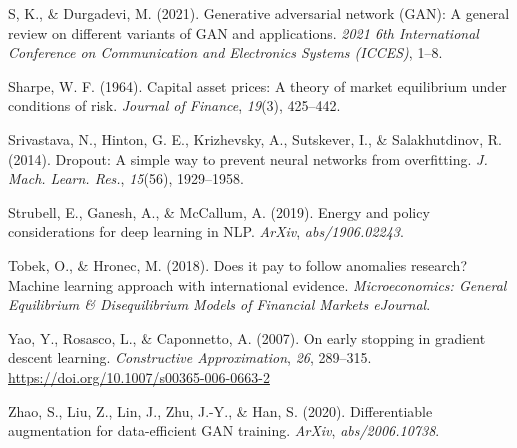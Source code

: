 \documentclass[12pt]{article}
\newlength{\cslhangindent}
\newlength{\cslentryspacingunit} %
\newenvironment{CSLReferences}[2] %
 {%
  \setlength{\parindent}{0pt}
  \ifodd #1
  \let\oldpar\par
  \def\par{\hangindent=\cslhangindent\oldpar}
  \fi
  \setlength{\parskip}{#2\cslentryspacingunit}
 }%
 {}
\begin{document}
\begin{CSLReferences}{1}{0}
\leavevmode{}%
S, K., \& Durgadevi, M. (2021). Generative adversarial network ({GAN}): A general review on different variants of {GAN} and applications. \emph{2021 6th International Conference on Communication and Electronics Systems ({ICCES})}, 1--8.

\leavevmode{}%
Sharpe, W. F. (1964). Capital asset prices: A theory of market equilibrium under conditions of risk. \emph{Journal of Finance}, \emph{19}(3), 425--442.

\leavevmode{}%
Srivastava, N., Hinton, G. E., Krizhevsky, A., Sutskever, I., \& Salakhutdinov, R. (2014). Dropout: A simple way to prevent neural networks from overfitting. \emph{J. Mach. Learn. Res.}, \emph{15}(56), 1929--1958.

\leavevmode{}%
Strubell, E., Ganesh, A., \& McCallum, A. (2019). Energy and policy considerations for deep learning in {NLP}. \emph{{ArXiv}}, \emph{abs/1906.02243}.

\leavevmode{}%
Tobek, O., \& Hronec, M. (2018). Does it pay to follow anomalies research? Machine learning approach with international evidence. \emph{Microeconomics: General Equilibrium \& Disequilibrium Models of Financial Markets {eJournal}}.

\leavevmode{}%
Yao, Y., Rosasco, L., \& Caponnetto, A. (2007). On early stopping in gradient descent learning. \emph{Constructive Approximation}, \emph{26}, 289--315. \url{https://doi.org/10.1007/s00365-006-0663-2}

\leavevmode{}%
Zhao, S., Liu, Z., Lin, J., Zhu, J.-Y., \& Han, S. (2020). Differentiable augmentation for data-efficient {GAN} training. \emph{{ArXiv}}, \emph{abs/2006.10738}.

\end{CSLReferences}
\end{document}
